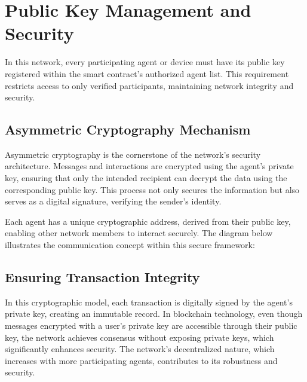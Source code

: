 \documentclass[a4paper,10pt,english]{sphinxmanual}
\let\sphinxpxdimen\pdfpxdimen\else\newdimen\sphinxpxdimen
\begin{document}
\section{Public Key Management and Security}
\label{\detokenize{introduction:public-key-management-and-security}}
\sphinxAtStartPar
In this network, every participating agent or device must have its public key registered within the smart contract’s authorized agent list. This requirement restricts access to only verified participants, maintaining network integrity and security.


\subsection{Asymmetric Cryptography Mechanism}
\label{\detokenize{introduction:asymmetric-cryptography-mechanism}}
\sphinxAtStartPar
Asymmetric cryptography is the cornerstone of the network’s security architecture. Messages and interactions are encrypted using the agent’s private key, ensuring that only the intended recipient can decrypt the data using the corresponding public key. This process not only secures the information but also serves as a digital signature, verifying the sender’s identity.

\sphinxAtStartPar
Each agent has a unique cryptographic address, derived from their public key, enabling other network members to interact securely. The diagram below illustrates the communication concept within this secure framework:

\noindent{\hspace*{\fill}\sphinxincludegraphics[width=600\sphinxpxdimen]{{communication-concept}.png}\hspace*{\fill}}


\subsection{Ensuring Transaction Integrity}
\label{\detokenize{introduction:ensuring-transaction-integrity}}
\sphinxAtStartPar
In this cryptographic model, each transaction is digitally signed by the agent’s private key, creating an immutable record. In blockchain technology, even though messages encrypted with a user’s private key are accessible through their public key, the network achieves consensus without exposing private keys, which significantly enhances security. The network’s decentralized nature, which increases with more participating agents, contributes to its robustness and security.
\end{document}
